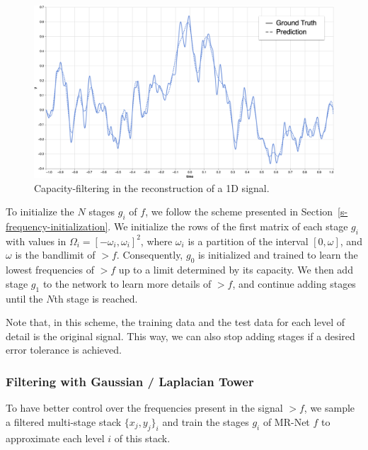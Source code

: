 \begin{figure}[!h]
\centering
\includegraphics[width=\linewidth]{img/ch4/capacity-filtering.png}
\caption{Capacity-filtering in the reconstruction of a 1D signal.}
\label{f:capacity-filtering}
\end{figure}

To initialize the $N$ stages ${g_i}$ of $f$, we follow the scheme presented in Section~\ref{s-frequency-initialization}. We initialize the rows of the first matrix of each stage $g_i$ with values in $\Omega_i=[-\omega_i, \omega_i]^2$, where ${\omega_i}$ is a partition of the interval $[0,\omega]$, and $\omega$ is the bandlimit of $\gt{f}$. Consequently, $g_0$ is initialized and trained to learn the lowest frequencies of $\gt{f}$ up to a limit determined by its capacity. We then add stage $g_1$ to the network to learn more details of $\gt{f}$, and continue adding stages until the $N$th stage is reached.

Note that, in this scheme, the training data and the test data for each level of detail is the original signal. This way, we can also stop adding stages if a desired error tolerance is achieved.


\subsubsection{Filtering with Gaussian / Laplacian Tower}

To have better control over the frequencies present in the signal $\gt{f}$, we sample a filtered multi-stage stack $\{x_j, y_j\}_i$ and train the stages $g_i$ of MR-Net $f$ to approximate each level $i$ of this stack.

